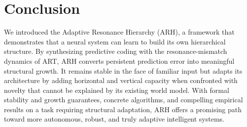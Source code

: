 \documentclass{article}
\begin{document}
\section{Conclusion}
We introduced the Adaptive Resonance Hierarchy (ARH), a framework that demonstrates that a neural system can learn to build its own hierarchical structure. By synthesizing predictive coding with the resonance-mismatch dynamics of ART, ARH converts persistent prediction error into meaningful structural growth. It remains stable in the face of familiar input but adapts its architecture by adding horizontal and vertical capacity when confronted with novelty that cannot be explained by its existing world model. With formal stability and growth guarantees, concrete algorithms, and compelling empirical results on a task requiring structural adaptation, ARH offers a promising path toward more autonomous, robust, and truly adaptive intelligent systems.



\end{document}
